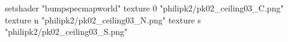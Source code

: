 setshader "bumpspecmapworld"
    texture 0 "philipk2/pk02_ceiling03_C.png"
    texture n "philipk2/pk02_ceiling03_N.png"
    texture s "philipk2/pk02_ceiling03_S.png"
